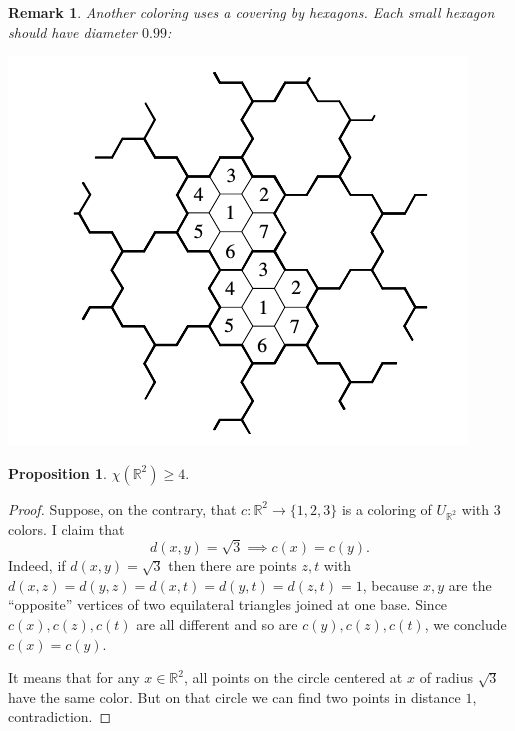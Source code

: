 \documentclass[a4paper]{article}
\theoremstyle{plain}
\newtheorem{proposition}[lemma]{Proposition}
\theoremstyle{myremark}
\newtheorem{remark}[lemma]{Remark}
\newcommand{\RR}{\mathbb{R}}
\begin{document}
\begin{remark}
Another coloring uses a covering by hexagons. Each small hexagon should have diameter $0.99$:
\begin{center}\includegraphics[scale=0.4]{mf5.png}\end{center}
\end{remark}


\begin{proposition}
$\chi(\RR^2)\geq 4.$
\end{proposition}
\begin{proof}
Suppose, on the contrary, that $c:\RR^2\to\{1,2,3\}$ is a coloring of $U_{\RR^2}$ with $3$ colors. I claim that 
$$d(x,y)=\sqrt{3} \implies c(x)=c(y).$$
Indeed, if $d(x,y)=\sqrt{3}$ then there are points $z,t$ with $d(x,z)=d(y,z)=d(x,t)=d(y,t)=d(z,t)=1$, because $x,y$ are the ``opposite'' vertices of two equilateral triangles joined at one base. Since $c(x),c(z),c(t)$ are all different and so are $c(y),c(z),c(t)$, we conclude $c(x)=c(y)$.

It means that for any $x\in\RR^2$, all points on the circle centered at $x$ of radius $\sqrt{3}$ have the same color. But on that circle we can find two points in distance $1$, contradiction.
\end{proof}
\end{document}

